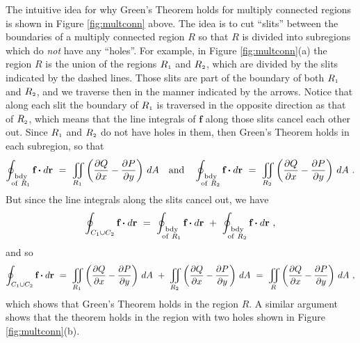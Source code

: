 The intuitive idea for why Green's Theorem holds for multiply connected regions is shown in Figure \ref{fig:multconn}
above. The idea is to cut ``slits'' between the boundaries of a multiply connected region $R$ so that $R$ is divided
into subregions which do \emph{not} have any ``holes''. For example, in Figure \ref{fig:multconn}(a) the region $R$
is the union of the regions $R_{\scriptscriptstyle 1}$ and $R_{\scriptscriptstyle 2}$, which are divided by the slits indicated by the dashed
lines. Those slits are part of the boundary of both $R_{\scriptscriptstyle 1}$ and $R_{\scriptscriptstyle 2}$, and we traverse then in the manner
indicated by the arrows. Notice that along each slit
the boundary of $R_{\scriptscriptstyle 1}$ is traversed in the opposite direction as that of $R_{\scriptscriptstyle 2}$, which means that the
line integrals of $\mathbf{f}$ along those slits cancel each other out.
Since $R_{\scriptscriptstyle 1}$ and $R_{\scriptscriptstyle 2}$ do not have holes in them, then Green's Theorem holds in each subregion, so that
\begin{displaymath}
 \oint_{\substack{\text{bdy}\\\text{of}~R_{\scriptscriptstyle 1}}} \textbf{f} \bm{\cdot} d\textbf{r} ~=~ \iint\limits_{R_{\scriptscriptstyle 1}}
  \left( \frac{\partial Q}{\partial x} - \frac{\partial P}{\partial y} \right)\,dA \quad\text{and}\quad
 \oint_{\substack{\text{bdy}\\\text{of}~R_{\scriptscriptstyle 2}}} \textbf{f} \bm{\cdot} d\textbf{r} ~=~ \iint\limits_{R_{\scriptscriptstyle 2}}
  \left( \frac{\partial Q}{\partial x} - \frac{\partial P}{\partial y} \right)\,dA ~.
\end{displaymath}
But since the line integrals along the slits cancel out, we have
\begin{displaymath}
 \oint_{C_{\scriptscriptstyle 1} \cup C_{\scriptscriptstyle 2}} \textbf{f} \bm{\cdot} d\textbf{r} ~=~
 \oint_{\substack{\text{bdy}\\\text{of}~R_{\scriptscriptstyle 1}}} \textbf{f} \bm{\cdot} d\textbf{r} ~+~
 \oint_{\substack{\text{bdy}\\\text{of}~R_{\scriptscriptstyle 2}}} \textbf{f} \bm{\cdot} d\textbf{r} ~,
\end{displaymath}
and so
\begin{displaymath}
 \oint_{C_{\scriptscriptstyle 1} \cup C_{\scriptscriptstyle 2}} \textbf{f} \bm{\cdot} d\textbf{r} ~=~ \iint\limits_{R_{\scriptscriptstyle 1}}
  \left( \frac{\partial Q}{\partial x} - \frac{\partial P}{\partial y} \right)\,dA ~+~ \iint\limits_{R_{\scriptscriptstyle 2}}
  \left( \frac{\partial Q}{\partial x} - \frac{\partial P}{\partial y} \right)\,dA ~=~ \iint\limits_{R}
  \left( \frac{\partial Q}{\partial x} - \frac{\partial P}{\partial y} \right)\,dA ~,
\end{displaymath}
which shows that Green's Theorem holds in the region $R$. A similar argument shows that the theorem holds in the
region with two holes shown in Figure \ref{fig:multconn}(b).

